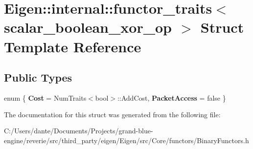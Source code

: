 \hypertarget{struct_eigen_1_1internal_1_1functor__traits_3_01scalar__boolean__xor__op_01_4}{}\section{Eigen\+::internal\+::functor\+\_\+traits$<$ scalar\+\_\+boolean\+\_\+xor\+\_\+op $>$ Struct Template Reference}
\label{struct_eigen_1_1internal_1_1functor__traits_3_01scalar__boolean__xor__op_01_4}
\subsection*{Public Types}
\begin{DoxyCompactItemize}
\item 
\mbox{\label{struct_eigen_1_1internal_1_1functor__traits_3_01scalar__boolean__xor__op_01_4_ac96a0190faf429533da290b9f900b15d}} 
enum \{ {\bfseries Cost} = Num\+Traits$<$bool$>$\+::Add\+Cost, 
{\bfseries Packet\+Access} = false
 \}
\end{DoxyCompactItemize}


The documentation for this struct was generated from the following file\+:\begin{DoxyCompactItemize}
\item 
C\+:/\+Users/dante/\+Documents/\+Projects/grand-\/blue-\/engine/reverie/src/third\+\_\+party/eigen/\+Eigen/src/\+Core/functors/Binary\+Functors.\+h\end{DoxyCompactItemize}
